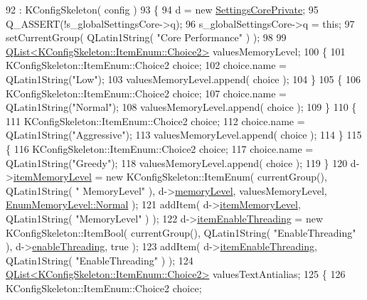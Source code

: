 \begin{DoxyCode}
92   : KConfigSkeleton( config )
93 \{
94   d = \textcolor{keyword}{new} \hyperlink{classOkular_1_1SettingsCorePrivate}{SettingsCorePrivate};
95   Q\_ASSERT(!s\_globalSettingsCore->q);
96   s\_globalSettingsCore->q = \textcolor{keyword}{this};
97   setCurrentGroup( QLatin1String( \textcolor{stringliteral}{"Core Performance"} ) );
98 
99   \hyperlink{classQList}{QList<KConfigSkeleton::ItemEnum::Choice2>} valuesMemoryLevel;
100   \{
101     KConfigSkeleton::ItemEnum::Choice2 choice;
102     choice.name = QLatin1String(\textcolor{stringliteral}{"Low"});
103     valuesMemoryLevel.append( choice );
104   \}
105   \{
106     KConfigSkeleton::ItemEnum::Choice2 choice;
107     choice.name = QLatin1String(\textcolor{stringliteral}{"Normal"});
108     valuesMemoryLevel.append( choice );
109   \}
110   \{
111     KConfigSkeleton::ItemEnum::Choice2 choice;
112     choice.name = QLatin1String(\textcolor{stringliteral}{"Aggressive"});
113     valuesMemoryLevel.append( choice );
114   \}
115   \{
116     KConfigSkeleton::ItemEnum::Choice2 choice;
117     choice.name = QLatin1String(\textcolor{stringliteral}{"Greedy"});
118     valuesMemoryLevel.append( choice );
119   \}
120   d->\hyperlink{classOkular_1_1SettingsCorePrivate_ad06afd9bb29a2031d0b8b59834b8a650}{itemMemoryLevel} = \textcolor{keyword}{new} KConfigSkeleton::ItemEnum( currentGroup(), QLatin1String( \textcolor{stringliteral}{"
      MemoryLevel"} ), d->\hyperlink{classOkular_1_1SettingsCorePrivate_a904bfb6bd05666c2ba7d3d69b74f91ea}{memoryLevel}, valuesMemoryLevel, \hyperlink{classOkular_1_1SettingsCore_1_1EnumMemoryLevel_a6dcad4c36c335a5cab78f24dd88090b4aab69bfc6de34e8bf9634a7586486296a}{EnumMemoryLevel::Normal} );
121   addItem( d->\hyperlink{classOkular_1_1SettingsCorePrivate_ad06afd9bb29a2031d0b8b59834b8a650}{itemMemoryLevel}, QLatin1String( \textcolor{stringliteral}{"MemoryLevel"} ) );
122   d->\hyperlink{classOkular_1_1SettingsCorePrivate_a18c995e3eb7f888a24600d0346e0ef5e}{itemEnableThreading} = \textcolor{keyword}{new} KConfigSkeleton::ItemBool( currentGroup(), QLatin1String(
       \textcolor{stringliteral}{"EnableThreading"} ), d->\hyperlink{classOkular_1_1SettingsCorePrivate_ac5767e8816765ebbbb42facce4ac649c}{enableThreading}, \textcolor{keyword}{true} );
123   addItem( d->\hyperlink{classOkular_1_1SettingsCorePrivate_a18c995e3eb7f888a24600d0346e0ef5e}{itemEnableThreading}, QLatin1String( \textcolor{stringliteral}{"EnableThreading"} ) );
124   \hyperlink{classQList}{QList<KConfigSkeleton::ItemEnum::Choice2>} valuesTextAntialias;
125   \{
126     KConfigSkeleton::ItemEnum::Choice2 choice;

\end{DoxyCode}
